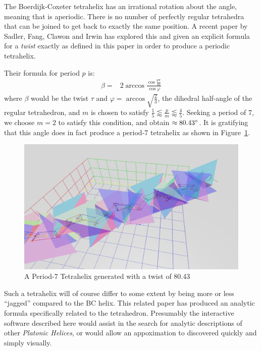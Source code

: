 \documentclass[mathematics,article,submit,pdftex,moreauthors]{Definitions/mdpi}
\begin{document}
The Boerdijk-Coxeter tetrahelix has an irrational rotation about the angle,
meaning that is aperiodic.
There is no number of perfectly regular tetrahedra that can be joined to get back to exactly
the same position.
A recent paper by Sadler, Fang, Clawon and Irwin \cite{sadler2019periodic} has explored this
and given an explicit formula for a {\em twist} exactly as defined in this
paper in order to produce a periodic tetrahelix.

Their formula for period $p$ is:
\begin{align}
  \beta =& 2 \arccos{\frac{\cos{\frac{p\pi}{m}}}{\cos{\varphi}}}
\end{align}
where $\beta$ would be the twist $\tau$ and $\varphi = \arccos{\sqrt{\frac{2}{3}}}$,
the dihedral half-angle of the regular tetrahedron, and $m$ is chosen to
satisfy $\frac{1}{5} \lessapprox \frac{p}{m} \lessapprox \frac{4}{5}$.
Seeking a period of 7, we choose $m = 2$ to satisfy this condition, and
obtain $\approx 80.43 \degree$. It is gratifying that this angle does
in fact produce a period-7 tetrahelix as shown in Figure~\ref{fig:periodseven}.

\begin{figure}
  \centering
  \captionsetup{justification=centering}
     \includegraphics[width=10 cm]{figures/Period7Tetrahelix.png}
     \caption{ A Period-7 Tetrahelix generated with a twist of 80.43\degree}
  \label{fig:periodseven}
\end{figure}
\unskip


Such a tetrahelix will
of course differ to some extent by being more or less ``jagged'' compared to the
BC helix. This related paper \cite{sadler2019periodic} has produced an analytic
formula specifically related to the tetrahedron. Presumably the interactive
software described here would assist in the search for analytic descriptions
of other {\em Platonic Helices}, or would allow an appoximation
to discovered quickly and simply visually.
\end{document}
